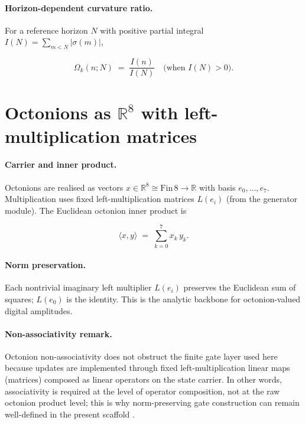 \documentclass[11pt,a4paper]{article}
\theoremstyle{remark}
\begin{document}
\paragraph{Horizon-dependent curvature ratio.}
For a reference horizon $N$ with positive partial integral $I(N)=\sum_{m<N}|\sigma(m)|$,

\begin{equation}
  \Omega_k(n;N) \;=\; \frac{I(n)}{I(N)} \quad\text{(when }I(N)>0\text{)}.
\end{equation}

\section{Octonions as \texorpdfstring{$\mathbb{R}^8$}{R8} with left-multiplication matrices}

\paragraph{Carrier and inner product.}
Octonions are realised as vectors $x\in\mathbb{R}^8\cong\mathrm{Fin}\,8\to\mathbb{R}$ with basis $e_0,\ldots,e_7$. Multiplication uses fixed left-multiplication matrices $L(e_i)$ (from the generator module). The Euclidean octonion inner product is

\begin{equation}
  \langle x,y\rangle \;=\; \sum_{k=0}^{7} x_k\,y_k.
\end{equation}

\paragraph{Norm preservation.}
Each nontrivial imaginary left multiplier $L(e_i)$ preserves the Euclidean sum of squares; $L(e_0)$ is the identity. This is the analytic backbone for octonion-valued digital amplitudes.

\paragraph{Non-associativity remark.}
Octonion non-associativity does not obstruct the finite gate layer used here because updates are implemented through fixed left-multiplication linear maps (matrices) composed as linear operators on the state carrier. In other words, associativity is required at the level of operator composition, not at the raw octonion product level; this is why norm-preserving gate construction can remain well-defined in the present scaffold \cite{baez2002octonions,freedman2019}.
\end{document}
